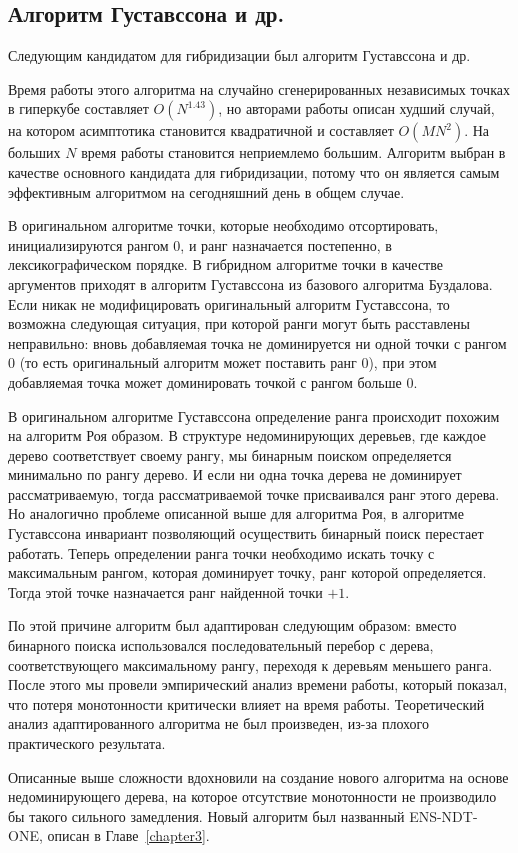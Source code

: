 \subsection{Алгоритм Густавссона и др.}

Следующим кандидатом для гибридизации был алгоритм Густавссона и др. 

Время работы этого алгоритма на случайно сгенерированных независимых точках в гиперкубе составляет $O(N^{1.43})$, но авторами работы описан худший случай, на котором асимптотика становится квадратичной и составляет $O(MN^2)$. На больших $N$ время работы становится неприемлемо большим. Алгоритм выбран в качестве основного кандидата для гибридизации, потому что он является самым эффективным алгоритмом на сегодняшний день в общем случае. 

В оригинальном алгоритме точки, которые необходимо отсортировать, инициализируются рангом $0$, и ранг назначается постепенно, в лексикографическом порядке. В гибридном алгоритме точки в качестве аргументов приходят в алгоритм Густавссона из базового алгоритма Буздалова. Если никак не модифицировать оригинальный алгоритм Густавссона, то возможна следующая ситуация, при которой ранги могут быть расставлены неправильно: вновь добавляемая точка не доминируется ни одной точки с рангом $0$ (то есть оригинальный алгоритм может поставить ранг $0$), при этом добавляемая точка может доминировать точкой с рангом больше $0$. 

В оригинальном алгоритме Густавссона определение ранга происходит похожим на алгоритм Роя образом. В структуре недоминирующих деревьев, где каждое дерево соответствует своему рангу, мы бинарным поиском определяется минимально по рангу дерево. И если ни одна точка дерева не доминирует рассматриваемую, тогда рассматриваемой точке присваивался ранг этого дерева. Но аналогично проблеме описанной выше для алгоритма Роя, в алгоритме Густавссона инвариант позволяющий осуществить бинарный поиск перестает работать. Теперь определении ранга точки необходимо искать точку с максимальным рангом, которая доминирует точку, ранг которой определяется. Тогда этой точке назначается ранг найденной точки $+ 1$.  

По этой причине алгоритм был адаптирован следующим образом: вместо бинарного поиска использовался последовательный перебор с дерева, соответствующего максимальному рангу, переходя к деревьям меньшего ранга. После этого мы провели эмпирический анализ времени работы, который показал, что потеря монотонности критически влияет на время работы. Теоретический анализ адаптированного алгоритма не был произведен, из-за плохого практического результата.

Описанные выше сложности вдохновили на создание нового алгоритма на основе недоминирующего дерева, на которое отсутствие монотонности не производило бы такого сильного замедления. Новый алгоритм был названный ENS-NDT-ONE, описан в Главе~\ref{chapter3}.


